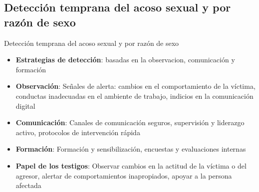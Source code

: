 \documentclass{beamer}
\begin{document}
    \subsection{Detección temprana del acoso sexual y por razón de sexo}
    \begin{frame}{Detección temprana del acoso sexual y por razón de sexo}
        \begin{itemize}
            \item \textbf{Estrategias de detección}: basadas en la observacion, comunicación y formación
            \item \textbf{Observación}: Señales de alerta: cambios en el comportamiento de la víctima, conductas inadecuadas en el ambiente de trabajo, indicios en la comunicación digital
            \item \textbf{Comunicación}: Canales de comunicación seguros, supervisión y liderazgo activo, protocolos de intervención rápida
            \item \textbf{Formación}: Formación y sensibilización, encuestas y evaluaciones internas
            \item \textbf{Papel de los testigos}: Observar cambios en la actitud de la víctima o del agresor, alertar de comportamientos inapropiados, apoyar a la persona afectada
        \end{itemize}
    \end{frame}
\end{document}

